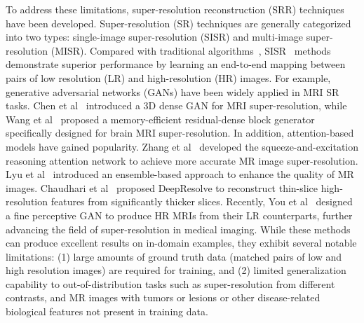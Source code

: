 \documentclass[AMA,STIX2COL]{MRM}
\begin{document}
To address these limitations, super-resolution reconstruction (SRR) techniques have been developed.
%
Super-resolution (SR) techniques are generally categorized into two types: single-image super-resolution (SISR) and multi-image super-resolution (MISR). 
%
Compared with traditional algorithms~\cite{gholipour2010robust, tourbier2015efficient, manjon2010non,sui2019isotropic,sui2021gradient}, SISR~\cite{bhowmik2017training} methods demonstrate superior performance by learning an end-to-end mapping between pairs of low resolution (LR) and high-resolution (HR) images. 
%
For example, generative adversarial networks (GANs) have been widely applied in MRI SR tasks. Chen et al~\cite{chen2018efficient} introduced a 3D dense GAN for MRI super-resolution, while Wang et al~\cite{wang2020enhanced} proposed a memory-efficient residual-dense block generator specifically designed for brain MRI super-resolution.
%
In addition, attention-based models have gained popularity. Zhang et al~\cite{zhang2021mr} developed the squeeze-and-excitation reasoning attention network to achieve more accurate MR image super-resolution. Lyu et al~\cite{lyu2020mri} introduced an ensemble-based approach to enhance the quality of MR images. Chaudhari et al~\cite{chaudhari2018super} proposed DeepResolve to reconstruct thin-slice high-resolution features from significantly thicker slices.
%
Recently, You et al~\cite{you2022fine} designed a fine perceptive GAN to produce HR MRIs from their LR counterparts, further advancing the field of super-resolution in medical imaging. While these methods can produce excellent results on in-domain examples, they exhibit several notable limitations: (1) large amounts of ground truth data (matched pairs of low and high resolution images) are required for training, and (2) limited generalization capability to out-of-distribution tasks such as super-resolution from different contrasts, and MR images with tumors or lesions or other disease-related biological features not present in training data.  
\end{document}
